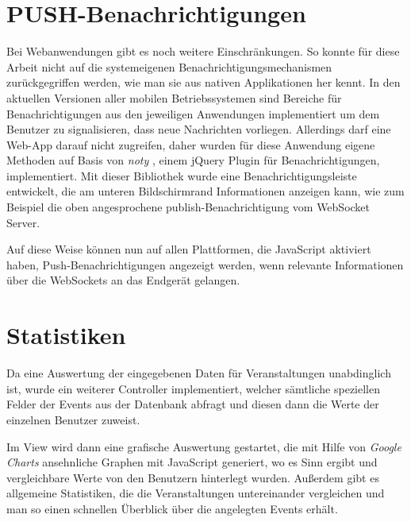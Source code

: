 \section{PUSH-Benachrichtigungen}
Bei Webanwendungen gibt es noch weitere Einschränkungen. So konnte für diese Arbeit nicht auf die systemeigenen Benachrichtigungsmechanismen zurückgegriffen werden, wie man sie aus nativen Applikationen her kennt. In den aktuellen Versionen aller mobilen Betriebssystemen sind Bereiche für Benachrichtigungen aus den jeweiligen Anwendungen implementiert um dem Benutzer zu signalisieren, dass neue Nachrichten vorliegen. Allerdings darf eine Web-App darauf nicht zugreifen, daher wurden für diese Anwendung eigene Methoden auf Basis von \emph{noty} \cite{noty}, einem jQuery Plugin für Benachrichtigungen, implementiert. Mit dieser Bibliothek wurde eine Benachrichtigungsleiste entwickelt, die am unteren Bildschirmrand Informationen anzeigen kann, wie zum Beispiel die oben angesprochene publish-Benachrichtigung vom WebSocket Server.\par

Auf diese Weise können nun auf allen Plattformen, die JavaScript aktiviert haben, Push-Benachrichtigungen angezeigt werden, wenn relevante Informationen über die WebSockets an das Endgerät gelangen.


\section{Statistiken}
Da eine Auswertung der eingegebenen Daten für Veranstaltungen unabdinglich ist, wurde ein weiterer Controller implementiert, welcher sämtliche speziellen Felder der Events aus der Datenbank abfragt und diesen dann die Werte der einzelnen Benutzer zuweist.\par

Im View wird dann eine grafische Auswertung gestartet, die mit Hilfe von \emph{Google Charts} \cite{google:charts} ansehnliche Graphen mit JavaScript generiert, wo es Sinn ergibt und vergleichbare Werte von den Benutzern hinterlegt wurden. Außerdem gibt es allgemeine Statistiken, die die Veranstaltungen untereinander vergleichen und man so einen schnellen Überblick über die angelegten Events erhält.